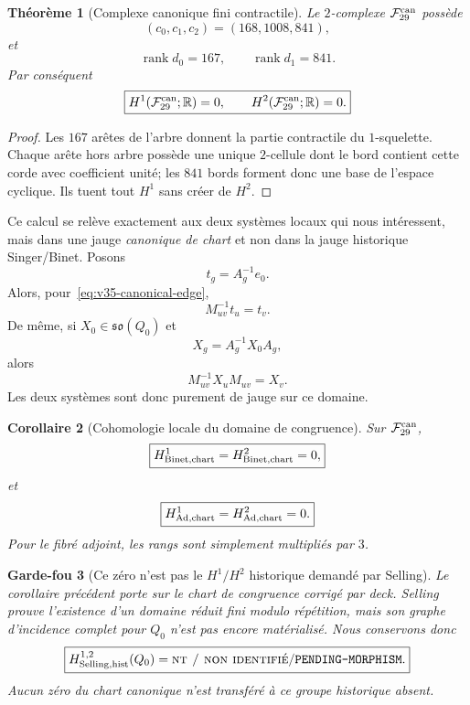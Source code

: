 \documentclass[11pt,a4paper]{article}
\newtheorem{theorem}{Théorème}[section]
\newtheorem{corollary}[theorem]{Corollaire}
\newtheorem{guardrail}[theorem]{Garde-fou}
\newcommand{\rank}{\operatorname{rank}}
\newcommand{\statusNT}{\textsc{nt / non identifié}}
\newcommand{\certPending}{\texttt{PENDING-MORPHISM}}
\begin{document}
\begin{theorem}[Complexe canonique fini contractile]\label{thm:v35-canonical-chart}
Le $2$-complexe $\mathcal F_{29}^{\rm can}$ poss\`ede
\[
 (c_0,c_1,c_2)=(168,1008,841),
\]
et
\[
 \rank d_0=167,\qquad \rank d_1=841.
\]
Par cons\'equent
\begin{equation}\label{eq:v35-chart-H12}
 \boxed{H^1(\mathcal F_{29}^{\rm can};\mathbb R)=0,
 \qquad H^2(\mathcal F_{29}^{\rm can};\mathbb R)=0.}
\end{equation}
\end{theorem}

\begin{proof}
Les $167$ ar\^etes de l'arbre donnent la partie contractile du $1$-squelette. Chaque ar\^ete hors
arbre poss\`ede une unique $2$-cellule dont le bord contient cette corde avec coefficient unit\'e;
les $841$ bords forment donc une base de l'espace cyclique. Ils tuent tout $H^1$ sans cr\'eer de
$H^2$.
\end{proof}

Ce calcul se rel\`eve exactement aux deux syst\`emes locaux qui nous int\'eressent, mais dans une
jauge \emph{canonique de chart} et non dans la jauge historique Singer/Binet. Posons
\[
 t_g=A_g^{-1}e_0.
\]
Alors, pour~\eqref{eq:v35-canonical-edge},
\[
 M_{uv}^{-1}t_u=t_v.
\]
De m\^eme, si $X_0\in\mathfrak{so}(Q_0)$ et
\[
 X_g=A_g^{-1}X_0A_g,
\]
alors
\[
 M_{uv}^{-1}X_uM_{uv}=X_v.
\]
Les deux syst\`emes sont donc purement de jauge sur ce domaine.

\begin{corollary}[Cohomologie locale du domaine de congruence]\label{cor:v35-local-H12-zero}
Sur $\mathcal F_{29}^{\rm can}$,
\[
 \boxed{H^1_{\rm Binet,chart}=H^2_{\rm Binet,chart}=0,}
\]
et
\[
 \boxed{H^1_{\rm Ad,chart}=H^2_{\rm Ad,chart}=0.}
\]
Pour le fibr\'e adjoint, les rangs sont simplement multipli\'es par $3$.
\end{corollary}

\begin{guardrail}[Ce z\'ero n'est pas le $H^1/H^2$ historique demand\'e par Selling]
Le corollaire pr\'ec\'edent porte sur le chart de congruence \emph{corrig\'e par deck}. Selling prouve
l'existence d'un domaine r\'eduit fini modulo r\'ep\'etition, mais son graphe d'incidence complet pour
$Q_0$ n'est pas encore mat\'erialis\'e. Nous conservons donc
\[
 \boxed{H^{1,2}_{\rm Selling,hist}(Q_0)=\statusNT/\certPending.}
\]
Aucun z\'ero du chart canonique n'est transf\'er\'e \`a ce groupe historique absent.
\end{guardrail}
\end{document}
